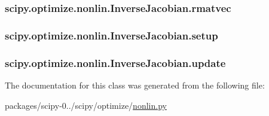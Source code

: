 \subsubsection[{rmatvec}]{\setlength{\rightskip}{0pt plus 5cm}scipy.\+optimize.\+nonlin.\+Inverse\+Jacobian.\+rmatvec}\label{classscipy_1_1optimize_1_1nonlin_1_1InverseJacobian_ac077f7e00dc5e263ce5cc33f9ef163ee}
\hypertarget{classscipy_1_1optimize_1_1nonlin_1_1InverseJacobian_a856473a4587975cc1c433297584d9ca1}{}
\subsubsection[{setup}]{\setlength{\rightskip}{0pt plus 5cm}scipy.\+optimize.\+nonlin.\+Inverse\+Jacobian.\+setup}\label{classscipy_1_1optimize_1_1nonlin_1_1InverseJacobian_a856473a4587975cc1c433297584d9ca1}
\hypertarget{classscipy_1_1optimize_1_1nonlin_1_1InverseJacobian_a72a07f217180db6b53ef6efd43f3ed87}{}
\subsubsection[{update}]{\setlength{\rightskip}{0pt plus 5cm}scipy.\+optimize.\+nonlin.\+Inverse\+Jacobian.\+update}\label{classscipy_1_1optimize_1_1nonlin_1_1InverseJacobian_a72a07f217180db6b53ef6efd43f3ed87}


The documentation for this class was generated from the following file\+:\begin{DoxyCompactItemize}
\item 
packages/scipy-\/0../scipy/optimize/\hyperlink{nonlin_8py}{nonlin.\+py}\end{DoxyCompactItemize}
